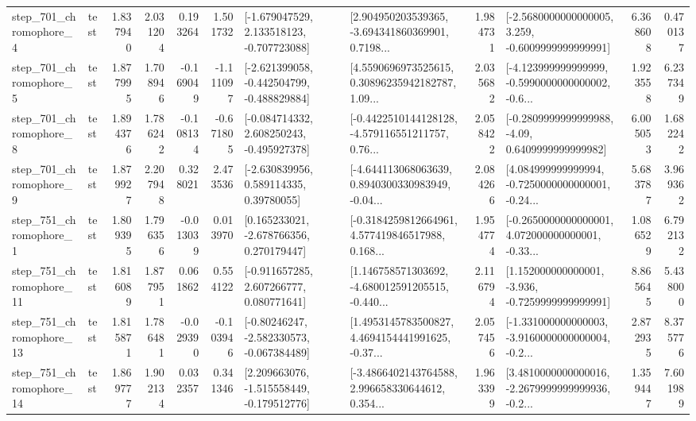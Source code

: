 \begin{tabular}{llrrrrllrlrr}
   step\_701\_chromophore\_4 &      test &      1.837940 &    2.031204 &      0.193264 &  1.501732 &   [-1.679047529, 2.133518123, -0.707723088] &  [2.904950203539365, -3.694341860369901, 0.7198... &       1.984731 &  [-2.5680000000000005, 3.259, -0.6009999999999991] &            6.368608 &          0.470137 \\
   step\_701\_chromophore\_5 &      test &      1.877995 &    1.708946 &     -0.169049 & -1.111097 &  [-2.621399058, -0.442504799, -0.488829884] &  [4.5590696973525615, 0.30896235942182787, 1.09... &       2.035682 &  [-4.123999999999999, -0.5990000000000002, -0.6... &            1.923558 &          6.237349 \\
   step\_701\_chromophore\_8 &      test &      1.894376 &    1.786242 &     -0.108134 & -0.671805 &   [-0.084714332, 2.608250243, -0.495927378] &  [-0.4422510144128128, -4.579116551211757, 0.76... &       2.058422 &   [-0.2809999999999988, -4.09, 0.6409999999999982] &            6.005053 &          1.682242 \\
   step\_701\_chromophore\_9 &      test &      1.879927 &    2.207948 &      0.328021 &  2.473536 &     [-2.630839956, 0.589114335, 0.39780055] &  [-4.644113068063639, 0.8940300330983949, -0.04... &       2.084266 &  [4.084999999999994, -0.7250000000000001, -0.24... &            5.683787 &          3.969362 \\
   step\_751\_chromophore\_1 &      test &      1.809395 &    1.796356 &     -0.013039 &  0.013970 &    [0.165233021, -2.678766356, 0.270179447] &  [-0.3184259812664961, 4.577419846517988, 0.168... &       1.954774 &  [-0.2650000000000001, 4.072000000000001, -0.33... &            1.086529 &          6.792132 \\
  step\_751\_chromophore\_11 &      test &      1.816089 &    1.877951 &      0.061862 &  0.554122 &    [-0.911657285, 2.607266777, 0.080771641] &  [1.146758571303692, -4.680012591205515, -0.440... &       2.116794 &   [1.152000000000001, -3.936, -0.7259999999999991] &            8.865645 &          5.438000 \\
  step\_751\_chromophore\_13 &      test &      1.815871 &    1.786481 &     -0.029390 & -0.103946 &   [-0.80246247, -2.582330573, -0.067384489] &  [1.4953145783500827, 4.4694154441991625, -0.37... &       2.057456 &  [-1.331000000000003, -3.9160000000000004, -0.2... &            2.872935 &          8.375776 \\
  step\_751\_chromophore\_14 &      test &      1.869777 &    1.902134 &      0.032357 &  0.341346 &   [2.209663076, -1.515558449, -0.179512776] &  [-3.4866402143764588, 2.996658330644612, 0.354... &       1.963399 &  [3.4810000000000016, -2.2679999999999936, -0.2... &            1.359447 &          7.601989 \\

\end{tabular}
